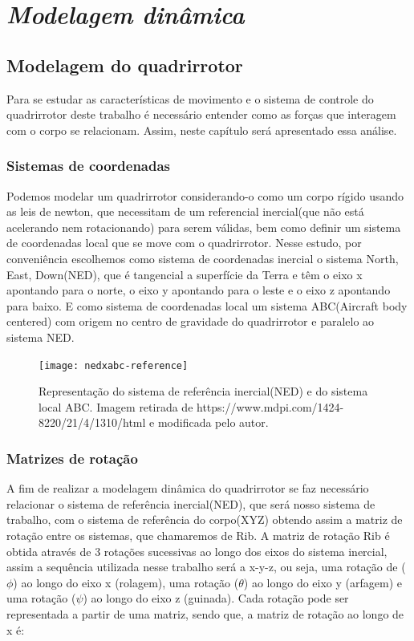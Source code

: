 \documentclass[
	12pt,				%
	openright,			%
	twoside,			%
	a4paper,			%
	english,			%
	brazil				%
	]{abntex2}
\begin{document}
\graphicspath{ {./images/} }



\chapter{\textit{Modelagem dinâmica}}


\section{Modelagem do quadrirrotor}

Para se estudar as características de movimento e o sistema de controle do quadrirrotor deste trabalho é necessário entender como as forças que interagem com o corpo se relacionam. Assim, neste capítulo será apresentado essa análise.

\subsection{Sistemas de coordenadas}

Podemos modelar um quadrirrotor considerando-o como um corpo rígido usando as leis de newton, que necessitam de um referencial inercial(que não está acelerando nem rotacionando) para serem válidas, bem como definir um sistema de coordenadas local que se move com o quadrirrotor.
Nesse estudo, por conveniência escolhemos como sistema de coordenadas inercial o sistema North, East, Down(NED), que é tangencial a superfície da Terra e têm o eixo x apontando para o norte, o eixo y apontando para o leste e o eixo z apontando para baixo. E como sistema de coordenadas local um sistema ABC(Aircraft body centered) com origem no centro de gravidade do quadrirrotor e paralelo ao sistema NED.

\begin{figure}[h]
	\centering
	\texttt{[image: nedxabc-reference]}
	\caption{Representação do sistema de referência inercial(NED) e do sistema local ABC. Imagem retirada de https://www.mdpi.com/1424-8220/21/4/1310/html e modificada pelo autor.}
	\centering
	\label{figure-quadricopter}
\end{figure}


\subsection{Matrizes de rotação}
A fim de realizar a modelagem dinâmica do quadrirrotor se faz necessário relacionar o sistema de referência inercial(NED), que será nosso sistema de trabalho, com o sistema de referência do corpo(XYZ) obtendo assim a matriz de rotação entre os sistemas, que chamaremos de Rib.
A matriz de rotação Rib é obtida através de 3 rotações sucessivas ao longo dos eixos do sistema inercial, assim a sequência utilizada nesse trabalho será a x-y-z, ou seja, uma rotação de ($\phi$) ao longo do eixo x (rolagem), uma rotação ($\theta$) ao longo do eixo y (arfagem) e uma rotação ($\psi$) ao longo do eixo z (guinada).
Cada rotação pode ser representada a partir de uma matriz, sendo que, a  matriz de rotação ao longo de x é:
\end{document}
